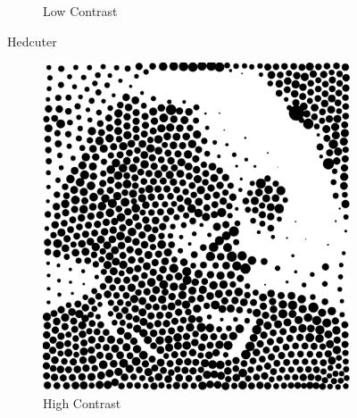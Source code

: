 \documentclass[11pt]{article}
\begin{document}
\begin{enumerate}
\begin{figure}[H]
\begin{subfigure}{0.4\textwidth}
         \caption{Low Contrast}
    \end{subfigure}
    \label{fig:1}
        \caption{Hedcuter}
\end{figure}

\begin{figure}[H]
    \centering
        \begin{subfigure}{0.4\textwidth}
        \centering
        \includegraphics[width=\textwidth]{../results/voronoi/3-1.pdf}
 \caption{High Contrast}
    \end{subfigure}
    \begin{subfigure}{0.4\textwidth}
        \centering

\end{subfigure}
\end{figure}
\end{enumerate}
\end{document}
